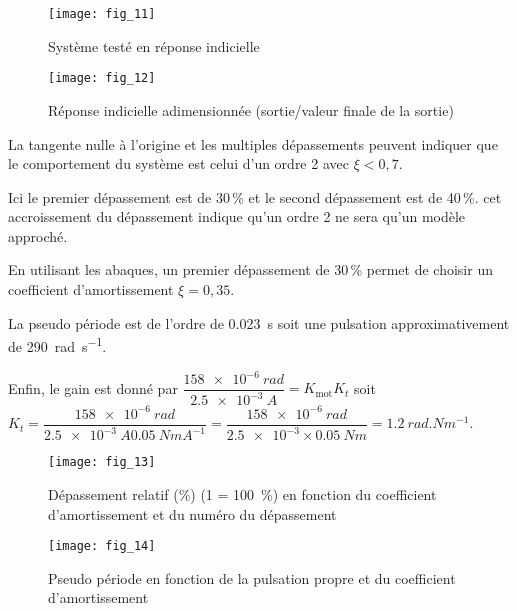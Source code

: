 \begin{figure}[H]
\centering
\texttt{[image: fig\_11]}
\caption{\label{fig_11} Système testé en réponse indicielle}
\end{figure}


\begin{figure}[H]
\centering
\texttt{[image: fig\_12]}
\caption{\label{fig_12} Réponse indicielle adimensionnée (sortie/valeur finale de la sortie)}
\end{figure}
\fi


\ifprof
\begin{corrige}
La tangente nulle à l'origine et les multiples dépassements peuvent indiquer que le comportement du système est celui d'un ordre 2 avec $\xi<0,7$.

Ici le premier dépassement est de 30\,\% et le second dépassement est de 40\,\%. cet accroissement du dépassement indique qu'un ordre 2 ne sera qu'un modèle approché. 

En utilisant les abaques, un premier dépassement de 30\,\% permet de choisir un coefficient d'amortissement $\xi =0,35$. 

La pseudo période est de l'ordre de \SI{0,023}{s} soit une pulsation approximativement de \SI{290}{rad.s^{-1}}.

Enfin, le gain est donné  par $ \dfrac{ \SI{158e-6}{rad}}{\SI{2,5e-3}{A}}=K_{\text{mot}} K_t $ soit 
$  K_t = \dfrac{ \SI{158e-6}{rad}}{\SI{2,5e-3}{A}\SI{0,05}{NmA^{-1}}}= \dfrac{ \SI{158e-6}{rad}}{\num{2,5e-3}\times \SI{0,05}{Nm}} =\SI{1,2}{rad.Nm^{-1}}$.
\end{corrige}
\else
\fi


\ifprof
\else
\begin{minipage}[c]{.47\linewidth}
\begin{figure}[H]
\centering
\texttt{[image: fig\_13]}
\caption{\label{fig_13} Dépassement relatif (\%) (1 = 100~\%) en fonction
du coefficient d’amortissement et du numéro du dépassement}
\end{figure}
\end{minipage}\hfill
\begin{minipage}[c]{.47\linewidth}
\begin{figure}[H]
\centering
\texttt{[image: fig\_14]}
\caption{\label{fig_14} Pseudo période en fonction de la pulsation
propre et du coefficient d’amortissement}
\end{figure}
\end{minipage}


